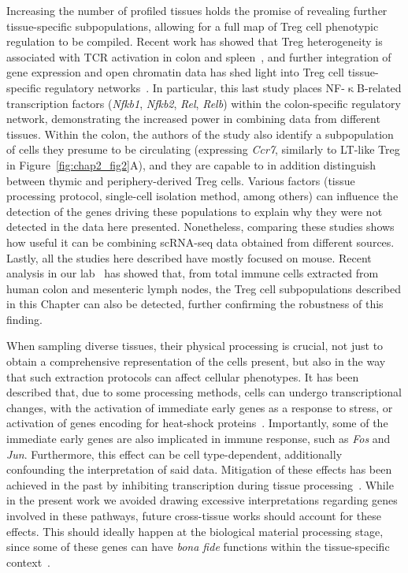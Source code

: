 Increasing the number of profiled tissues holds the promise of revealing further tissue-specific subpopulations, allowing for a full map of Treg cell phenotypic regulation to be compiled. Recent work has showed that Treg heterogeneity is associated with TCR activation in colon and spleen~\citep{zemmour_single-cell_2018}, and further integration of gene expression and open chromatin data has shed light into Treg cell tissue-specific regulatory networks~\citep{dispirito_molecular_2018}. In particular, this last study places NF-${\upkappa}$B-related transcription factors (\textit{Nfkb1}, \textit{Nfkb2}, \textit{Rel}, \textit{Relb}) within the colon-specific regulatory network, demonstrating the increased power in combining data from different tissues. Within the colon, the authors of the study also identify a subpopulation of cells they presume to be circulating (expressing \textit{Ccr7}, similarly to LT-like Treg in Figure~\ref{fig:chap2_fig2}A), and they are capable to in addition distinguish between thymic and periphery-derived Treg cells. Various factors (tissue processing protocol, single-cell isolation method, among others) can influence the detection of the genes driving these populations to explain why they were not detected in the data here presented. Nonetheless, comparing these studies shows how useful it can be combining scRNA-seq data obtained from different sources. Lastly, all the studies here described have mostly focused on mouse. Recent analysis in our lab~\citep{james_distinct_2019} has showed that, from total immune cells extracted from human colon and mesenteric lymph nodes, the Treg cell subpopulations described in this Chapter can also be detected, further confirming the robustness of this finding.

When sampling diverse tissues, their physical processing is crucial, not just to obtain a comprehensive representation of the cells present, but also in the way that such extraction protocols can affect cellular phenotypes. It has been described that, due to some processing methods, cells can undergo transcriptional changes, with the activation of immediate early genes as a response to stress, or activation of genes encoding for heat-shock proteins~\citep{Van_den_Brink2017-lg}. Importantly, some of the immediate early genes are also implicated in immune response, such as \textit{Fos} and \textit{Jun}. Furthermore, this effect can be cell type-dependent, additionally confounding the interpretation of said data. Mitigation of these effects has been achieved in the past by inhibiting transcription during tissue processing~\citep{Wu2017-jn}. While in the present work we avoided drawing excessive interpretations regarding genes involved in these pathways, future cross-tissue works should account for these effects. This should ideally happen at the biological material processing stage, since some of these genes can have \textit{bona fide} functions within the tissue-specific context~\citep{wheaton_junb_2019}.

